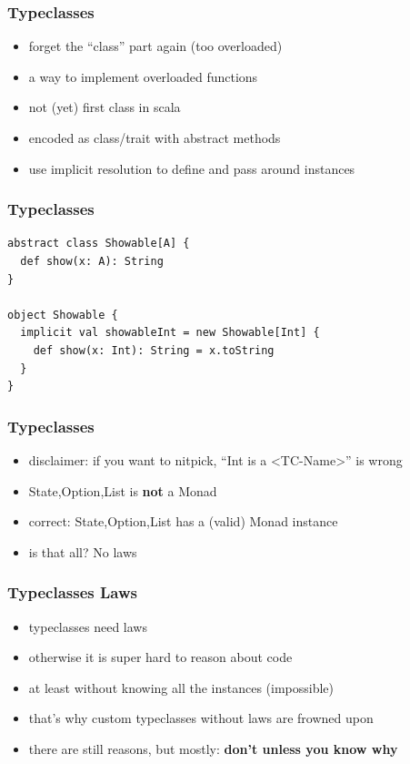 \documentclass[aspectratio=169]{beamer}
\begin{document}
\begin{frame}
  \frametitle{Typeclasses}
  \begin{itemize}
  \item forget the ``class'' part again (too overloaded)
  \item a way to implement overloaded functions
  \item not (yet) first class in scala
  \item encoded as class/trait with abstract methods
  \item use implicit resolution to define and pass around instances
  \end{itemize}
\end{frame}

\begin{frame}[fragile]
  \frametitle{Typeclasses}
  \begin{verbatim}
abstract class Showable[A] {
  def show(x: A): String
}

object Showable {
  implicit val showableInt = new Showable[Int] {
    def show(x: Int): String = x.toString
  }
}
  \end{verbatim}
\end{frame}

\begin{frame}
  \frametitle{Typeclasses}
  \begin{itemize}
  \item disclaimer: if you want to nitpick, ``Int is a <TC-Name>'' is wrong
  \item {State,Option,List} is \textbf{not} a Monad
  \item correct: {State,Option,List} has a (valid) Monad instance
  \item is that all? No \textemdash{} laws
  \end{itemize}
\end{frame}

\begin{frame}
  \frametitle{Typeclasses \textemdash{} Laws}
  \begin{itemize}
  \item typeclasses need laws
  \item otherwise it is super hard to reason about code
  \item at least without knowing all the instances (impossible)
  \item that's why custom typeclasses without laws are frowned upon
  \item there are still reasons, but mostly: \textbf{don't unless you know why}
  \end{itemize}
\end{frame}
\end{document}
